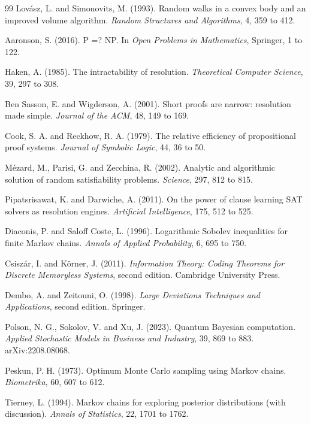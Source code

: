 \documentclass[11pt,twoside,openany]{book}
\theoremstyle{plain}
\theoremstyle{definition}
\theoremstyle{remark}
\begin{document}
\begin{thebibliography}{99}
 Lov\'asz, L. and Simonovits, M. (1993). Random walks in a convex body and an improved volume algorithm. \emph{Random Structures and Algorithms}, 4, 359 to 412.

 Aaronson, S. (2016). P =? NP. In \emph{Open Problems in Mathematics}, Springer, 1 to 122.


 Haken, A. (1985). The intractability of resolution. \emph{Theoretical Computer Science}, 39, 297 to 308.

 Ben Sasson, E. and Wigderson, A. (2001). Short proofs are narrow: resolution made simple. \emph{Journal of the ACM}, 48, 149 to 169.

 Cook, S. A. and Reckhow, R. A. (1979). The relative efficiency of propositional proof systems. \emph{Journal of Symbolic Logic}, 44, 36 to 50.

 M\'ezard, M., Parisi, G. and Zecchina, R. (2002). Analytic and algorithmic solution of random satisfiability problems. \emph{Science}, 297, 812 to 815.

 Pipatsrisawat, K. and Darwiche, A. (2011). On the power of clause learning SAT solvers as resolution engines. \emph{Artificial Intelligence}, 175, 512 to 525.

 Diaconis, P. and Saloff Coste, L. (1996). Logarithmic Sobolev inequalities for finite Markov chains. \emph{Annals of Applied Probability}, 6, 695 to 750.

 Csisz\'ar, I. and K\"orner, J. (2011). \emph{Information Theory: Coding Theorems for Discrete Memoryless Systems}, second edition. Cambridge University Press.

 Dembo, A. and Zeitouni, O. (1998). \emph{Large Deviations Techniques and Applications}, second edition. Springer.


 Polson, N. G., Sokolov, V. and Xu, J. (2023). Quantum Bayesian computation. \emph{Applied Stochastic Models in Business and Industry}, 39, 869 to 883. arXiv:2208.08068.


 Peskun, P. H. (1973). Optimum Monte Carlo sampling using Markov chains. \emph{Biometrika}, 60, 607 to 612.

 Tierney, L. (1994). Markov chains for exploring posterior distributions (with discussion). \emph{Annals of Statistics}, 22, 1701 to 1762.


\end{thebibliography}
\end{document}
